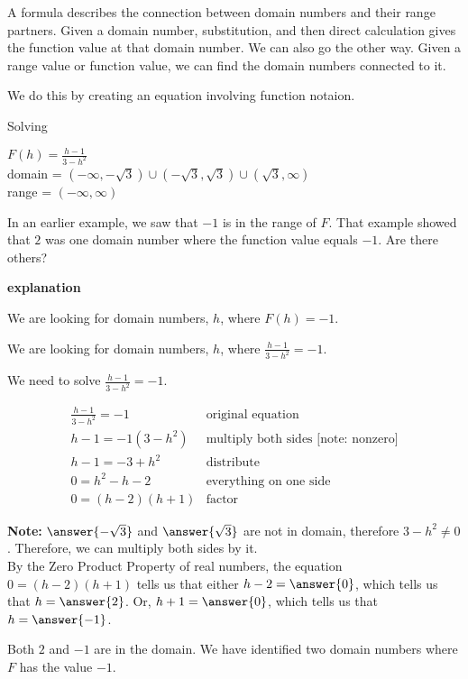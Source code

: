 \documentclass{ximera}
\begin{document}
A formula describes the connection between domain numbers and their range partners.  Given a domain number, substitution, and then direct calculation gives the function value at that domain number.  We can also go the other way.  Given a range value or function value, we can find the domain numbers connected to it.

We do this by creating an equation involving function notaion.














\newpage

\begin{example}   Solving 

$F(h) = \frac{h-1}{3-h^2}$ \\
domain = $(-\infty, -\sqrt{3}) \cup (-\sqrt{3}, \sqrt{3}) \cup (\sqrt{3}, \infty)$ \\
range = $(-\infty, \infty)$


In an earlier example, we saw that $-1$ is in the range of $F$.  That example showed that $2$ was one domain number where the function value equals $-1$. Are there others?



\textbf{explanation}


We are looking for domain numbers, $h$, where $F(h) = -1$.  

We are looking for domain numbers, $h$, where $\frac{h-1}{3-h^2} = -1$.  

We need to solve $\frac{h-1}{3-h^2} = -1$.



\[
\begin{array}{ll}
\frac{h-1}{3-h^2} = -1 &  \text{original equation} \\
h - 1 = -1 (3-h^2)    &  \text{multiply both sides [note: nonzero]} \\
h - 1 = -3 + h^2    &      \text{distribute} \\
0 = h^2 - h - 2    &      \text{everything on one side} \\
0 =(h-2)(h+1)    &   \text{factor}   
\end{array}
\]



\textbf{Note:}  $\answer{-\sqrt{3}}$ and $\answer{\sqrt{3}}$ are not in domain, therefore $3 - h^2 \ne 0$. Therefore, we can multiply both sides by it.  \\



By the Zero Product Property of real numbers, the equation $0 =(h-2)(h+1)$ tells us that either $h-2 = \answer{0}$, which tells us that $h = \answer{2}$. Or, $h+1 = \answer{0}$, which tells us that $h = \answer{-1}$.

Both $2$ and $-1$ are in the domain.  We have identified two domain numbers where $F$ has the value $-1$.



\end{example}
\end{document}
